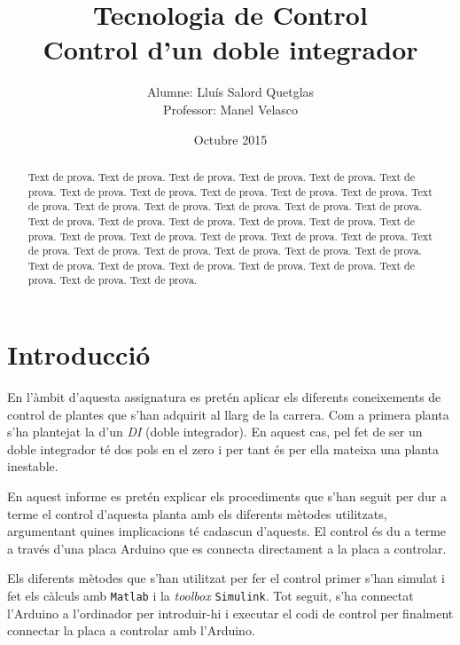 \documentclass[12pt,a4paper,final,twoside,openright]{report}
\title{Tecnologia de Control \\ Control d'un doble integrador}
\author{Alumne: Lluís Salord Quetglas \\ Professor: Manel Velasco}
\date{Octubre 2015}
\begin{document}
\maketitle
\thispagestyle{empty}

\cleardoublepage

\setcounter{page}{1} %

\begin{abstract}

Text de prova. Text de prova. Text de prova. Text de prova. Text de prova. Text de prova. Text de prova. Text de prova. Text de prova. Text de prova. Text de prova. Text de prova. Text de prova. Text de prova. Text de prova. Text de prova. Text de prova. Text de prova. Text de prova. Text de prova. Text de prova. Text de prova. Text de prova. Text de prova. Text de prova. Text de prova. Text de prova. Text de prova. Text de prova. Text de prova. Text de prova. Text de prova. Text de prova. Text de prova. Text de prova. Text de prova. Text de prova. Text de prova. Text de prova. Text de prova. Text de prova. Text de prova.

\end{abstract}

\tableofcontents

\listoffigures

\listoftables

\chapter{Introducció}

En l'àmbit d'aquesta assignatura es pretén aplicar els diferents coneixements de control de plantes que s'han adquirit al llarg de la carrera. Com a primera planta s'ha plantejat la d'un \textit{DI} (doble integrador). En aquest cas, pel fet de ser un doble integrador té dos pols en el zero i per tant és per ella mateixa una planta inestable.

En aquest informe es pretén explicar els procediments que s'han seguit per dur a terme el control d'aquesta planta amb els diferents mètodes utilitzats, argumentant quines implicacions té cadascun d'aquests. El control és du a terme a través d'una placa Arduino que es connecta directament a la placa a controlar.

Els diferents mètodes que s'han utilitzat per fer el control primer s'han simulat i fet els càlculs amb \texttt{Matlab} i la \textit{toolbox} \texttt{Simulink}. Tot seguit, s'ha connectat l'Arduino a l'ordinador per introduir-hi i executar el codi de control per finalment connectar la placa a controlar amb l'Arduino.
\end{document}
